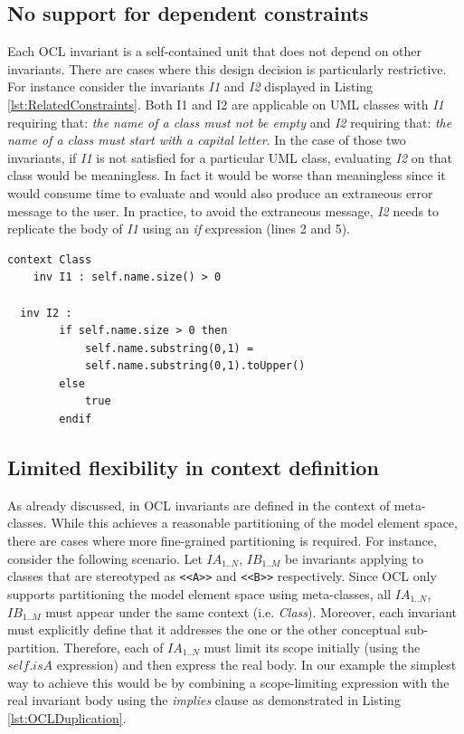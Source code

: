 \subsection{No support for dependent constraints}
\label{sec:Issue3}
Each OCL invariant is a self-contained unit that does not depend on other invariants. There are cases where this design decision is particularly restrictive. For instance consider the invariants \emph{I1} and \emph{I2} displayed in Listing \ref{lst:RelatedConstraints}. Both I1 and I2 are applicable on UML classes with \emph{I1} requiring that: \textit{the name of a class must not be empty} and \emph{I2} requiring that: \textit{the name of a class must start with a capital letter}. In the case of those two invariants, if \emph{I1} is not satisfied for a particular UML class, evaluating \emph{I2} on that class would be meaningless. In fact it would be worse than meaningless since it would consume time to evaluate and would also produce an extraneous error message to the user. In practice, to avoid the extraneous message, \emph{I2} needs to replicate the body of \emph{I1} using an \textit{if} expression (lines 2 and 5).

\begin{lstlisting}[caption=Conceptually related OCL constraints, label=lst:RelatedConstraints, language=OCL]
context Class
	inv I1 : self.name.size() > 0
    	
  inv I2 : 
		if self.name.size > 0 then
			self.name.substring(0,1) =
			self.name.substring(0,1).toUpper()
		else
			true
		endif
\end{lstlisting}

\subsection{Limited flexibility in context definition}
\label{sec:Issue4}
As already discussed, in OCL invariants are defined in the context of meta-classes. While this achieves a reasonable partitioning of the model element space, there are cases where more fine-grained partitioning is required. For instance, consider the following scenario. Let $IA_{1..N}$, $IB_{1..M}$ be invariants applying to classes that are stereotyped as \verb|<<A>>| and \verb|<<B>>| respectively. Since OCL only supports partitioning the model element space using meta-classes, all $IA_{1..N}$, $IB_{1..M}$ must appear under the same context (i.e. \textit{Class}). Moreover, each invariant must explicitly define that it addresses the one or the other conceptual sub-partition. Therefore, each of $IA_{1..N}$ must limit its scope initially (using the $self.isA$ expression) and then express the real body. In our example the simplest way to achieve this would be by combining a scope-limiting expression with the real invariant body using the \textit{implies} clause as demonstrated in Listing \ref{lst:OCLDuplication}.

